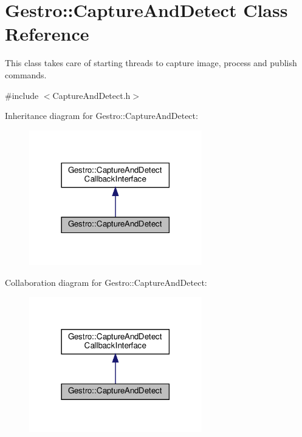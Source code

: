 \hypertarget{classGestro_1_1CaptureAndDetect}{}\section{Gestro\+:\+:Capture\+And\+Detect Class Reference}
\label{classGestro_1_1CaptureAndDetect}


This class takes care of starting threads to capture image, process and publish commands.  




{\ttfamily \#include $<$Capture\+And\+Detect.\+h$>$}



Inheritance diagram for Gestro\+:\+:Capture\+And\+Detect\+:
\nopagebreak
\begin{figure}[H]
\begin{center}
\leavevmode
\includegraphics[width=213pt]{classGestro_1_1CaptureAndDetect__inherit__graph}
\end{center}
\end{figure}


Collaboration diagram for Gestro\+:\+:Capture\+And\+Detect\+:
\nopagebreak
\begin{figure}[H]
\begin{center}
\leavevmode
\includegraphics[width=213pt]{classGestro_1_1CaptureAndDetect__coll__graph}
\end{center}
\end{figure}
